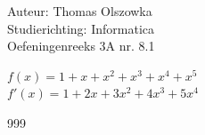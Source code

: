 \documentclass[a4paper]{article}
\begin{document}
\noindent \large Auteur: Thomas Olszowka \\
\noindent \large Studierichting: Informatica\\
\noindent \large Oefeningenreeks 3A nr. 8.1\\

\medskip

\normalsize

$f(x) = 1 + x + x^2 + x^3 + x^4 + x^5$ \\

$f'(x) = 1 + 2x + 3x^2 + 4x^3 + 5x^4$ \\

\begin{thebibliography}{999}
\end{thebibliography}
\end{document}
